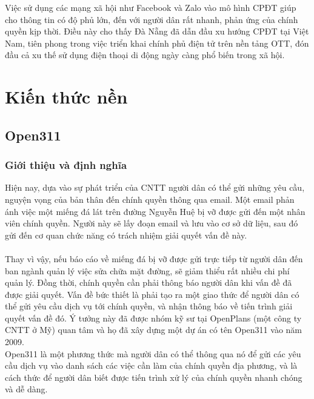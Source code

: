\documentclass[a4paper]{article}
\begin{document}
Việc sử dụng các mạng xã hội như Facebook và Zalo vào mô hình CPĐT giúp cho thông tin có độ phủ lớn, đến với người dân rất nhanh, phản ứng của chính quyền kịp thời. Điều này cho thấy Đà Nẵng đã dẫn đầu xu hướng CPĐT tại Việt Nam, tiên phong trong việc triển khai chính phủ điện tử trên nền tảng OTT, đón đầu cả xu thế sử dụng điện thoại di động ngày càng phổ biến trong xã hội.
\section{Kiến thức nền}
\subsection{Open311}
\subsubsection{Giới thiệu và định nghĩa}
Hiện nay, dựa vào sự phát triển của CNTT người dân có thể gửi những yêu cầu, nguyện vọng của bản thân đến chính quyền thông qua email. Một email phản ánh việc một miếng đá lát trên đường Nguyễn Huệ bị vỡ được gửi đến một nhân viên chính quyền. Người này sẽ lấy đoạn email và lưu vào cơ sở dữ liệu, sau đó gửi đến cơ quan chức năng có trách nhiệm giải quyết vấn đề này.\\
\\
Thay vì vậy, nếu báo cáo về miếng đá bị vỡ được gửi trực tiếp từ người dân đến ban ngành quản lý việc sửa chữa mặt đường, sẽ giảm thiểu rất nhiều chi phí quản lý. Đồng thời, chính quyền cần phải thông báo người dân khi vấn đề đã được giải quyết. Vấn đề bức thiết là phải tạo ra một giao thức để người dân có thể gửi yêu cầu dịch vụ tới chính quyền, và nhận thông báo về tiến trình giải quyết vấn đề đó. Ý tưởng này đã được nhóm kỹ sư tại OpenPlans (một công ty CNTT ở Mỹ) quan tâm và họ đã xây dựng một dự án có tên Open311 vào năm 2009.\\
\newpage
Open311 là một phương thức mà người dân có thể thông qua nó để gửi các yêu cầu dịch vụ vào danh sách các việc cần làm của chính quyền địa phương, và là cách thức để người dân biết được tiến trình xử lý của chính quyền nhanh chóng và dễ dàng.
\end{document}
